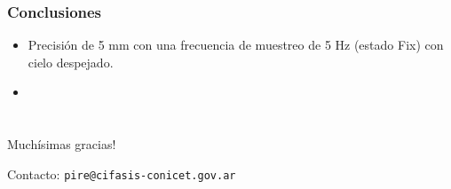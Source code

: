 \documentclass[compress]{beamer}
\begin{document}
\begin{frame}
	\frametitle{Conclusiones}
	\begin{itemize}
		\item Precisión de 5 mm con una frecuencia de muestreo de 5 Hz (estado Fix) con cielo despejado.
		\item 
	\end{itemize}
\end{frame}


\section*{}

\begin{frame}
	\centering
	\Large{Muchísimas gracias!}
	
	
	\vspace{2cm}
	Contacto: {\tt pire@cifasis-conicet.gov.ar}
\end{frame}



\end{document}
